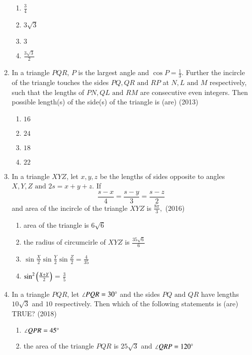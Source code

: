 \begin{enumerate}[label=\thesubsection.\arabic*,ref=\thesubsection.\theenumi]
\begin{multicols}{4}
    	\begin{enumerate}
    		\item ${\frac{3}{4}}$
    		\item $3\sqrt{3}$
    		\item $3$
    		\item ${\frac{3\sqrt{3}}{2}}$
    	\end{enumerate}
    \end{multicols}
    \item In a triangle $PQR$, ${P}$ is the largest angle and $\cos{P} = \frac{1}{3}$. Further the incircle of the triangle touches the sides $PQ,QR \text{ and } RP$ at ${N},{L} \text{ and } {M}$ respectively, such that the lengths of $PN, QL \text{ and } RM$ are consecutive even integers. Then possible length(s) of the side(s) of the triangle is (are)
    \hfill{(2013)}
    \begin{multicols}{4}
    	\begin{enumerate}
    		\item $16$
    		\item $24$
    		\item $18$
    		\item $22$
    	\end{enumerate}
    \end{multicols}
    \item In a triangle $XYZ$, let $x,y,z$ be the lengths of sides opposite to angles ${X},{Y},{Z} \text{ and } 2s = x+y+z$. If $${\frac{s-x}{4}}={\frac{s-y}{3}}={\frac{s-z}{2}}$$ and area of the incircle of the triangle $XYZ$ is ${\frac{8\pi}{3}},$
    \hfill{(2016)}
    \begin{enumerate}
    	\item area of the triangle is $6\sqrt{6}$
    	\item the radius of circumcirle of $XYZ$ is ${\frac{35\sqrt{6}}{6}}$
    	\item $\sin\frac{X}{2}\sin\frac{Y}{2}\sin\frac{Z}{2} = \frac{4}{35}$
    	\item $\sin^{2}\left(\frac{X+Y}{2}\right)$ = $\frac{3}{5}$
    \end{enumerate}
    \item In a triangle $PQR$, let $\angle PQR = 30\degree$ and the sides $PQ \text{ and } QR$ have lengths $10\sqrt{3}$ and $10$ respectively. Then which of the following statements is (are)  TRUE?
    \hfill{(2018)}
    \begin{enumerate}
    	\item $\angle QPR = 45\degree$
    	\item the area of the triangle $PQR$ is $25\sqrt{3}$ and $\angle QRP = 120\degree$

\end{enumerate}
\end{enumerate}
